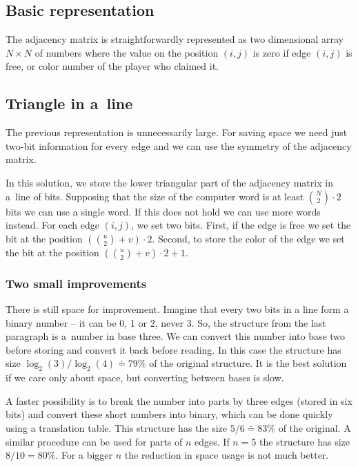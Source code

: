 \subsection{Basic representation }
The adjacency matrix is straightforwardly represented as two 
dimensional array $N \times N$ of numbers where the value on the position
$(i,j)$ is zero if edge $(i,j)$ is free, or color number of the player who claimed it.

\subsection{Triangle in a~line }

The previous representation is unnecessarily large. For saving space we need just
two-bit information for every edge and we can use the symmetry of the adjacency
matrix. 

In this solution, we store the lower triangular part of the adjacency matrix in a~line of
bits. Supposing that the size of the computer word is at least ${N
\choose 2} \cdot 2$ bits we can use a single word. If this does not hold we can use more
words instead. For each edge $(i,j)$, we set two bits. First, if the edge is free
we set the bit at the position $({u \choose 2}+v)\cdot2$. Second, to store the color of
the edge we set the bit at the position $({u \choose 2}+v)\cdot2+1$.

\subsubsection{Two small improvements}

There is still space for improvement. Imagine that every two bits in a line form
a binary number -- it can be 0, 1 or 2, never 3. So, the structure from the last
paragraph is a~number in base three. We can convert this number into base two
before storing and convert it back before reading. In this case the structure has
size $ \log_2(3)/\log_2(4) \doteq 79\% $ of the original structure. It is the best solution if we care
only about space, but converting between bases is slow.

A faster possibility is to break the number into parts by three edges (stored
in six bits) and convert these short numbers into binary, which can be done
quickly using a translation table. This structure has the size $5/6 \doteq 83\%
$ of the original. A similar procedure can be used for parts of $n$ edges. If
$n=5$ the structure has size $8/10=80\%$. For a bigger $n$ the reduction in space
usage is not much better.

